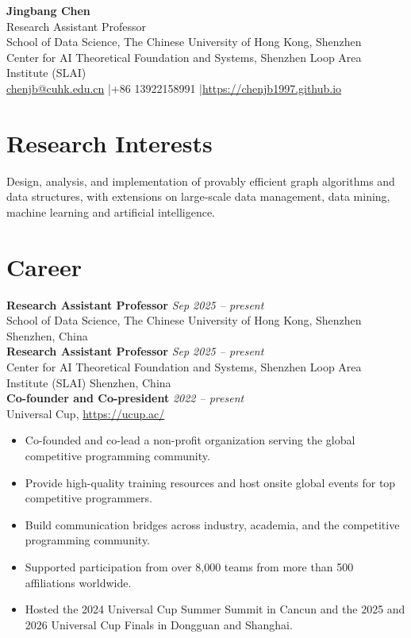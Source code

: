 \documentclass[10pt]{article}
\newcommand{\entry}[4]{%
  \textbf{#1} \hfill \emph{#2}\\
  #3 \hfill #4\\[-2pt]
}
\begin{document}
\begin{center}
  {\LARGE \textbf{Jingbang Chen}}\\
  Research Assistant Professor\\
  School of Data Science, The Chinese University of Hong Kong, Shenzhen\\
  Center for AI Theoretical Foundation and Systems, Shenzhen Loop Area Institute (SLAI)\\
  \href{mailto:chenjb@cuhk.edu.cn}{chenjb@cuhk.edu.cn}
  \quad|\quad +86 13922158991
  \quad|\quad \url{https://chenjb1997.github.io}
\end{center}

\section*{Research Interests}
Design, analysis, and implementation of provably efficient graph algorithms and data structures, with extensions on large-scale data management, data mining, machine learning and artificial intelligence.

\section*{Career}
\entry{Research Assistant Professor}{Sep 2025 -- present}
{School of Data Science, The Chinese University of Hong Kong, Shenzhen}{Shenzhen, China}
\entry{Research Assistant Professor}{Sep 2025 -- present}
{Center for AI Theoretical Foundation and Systems, Shenzhen Loop Area Institute (SLAI)}{Shenzhen, China}
\textbf{Co-founder and Co-president} \hfill \emph{2022 -- present}\\
Universal Cup, \url{https://ucup.ac/}\\[-2pt]
\begin{itemize}
  \item Co-founded and co-lead a non-profit organization serving the global competitive programming community.
  \item Provide high-quality training resources and host onsite global events for top competitive programmers.
  \item Build communication bridges across industry, academia, and the competitive programming community.
  \item Supported participation from over 8,000 teams from more than 500 affiliations worldwide.
  \item Hosted the 2024 Universal Cup Summer Summit in Cancun and the 2025 and 2026 Universal Cup Finals in Dongguan and Shanghai.
\end{itemize}
\end{document}
